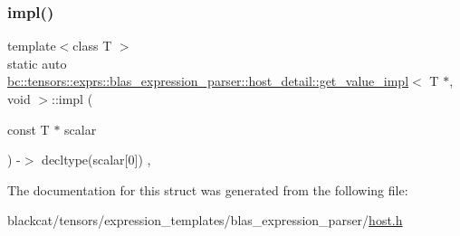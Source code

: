 \subsubsection{\texorpdfstring{impl()}{impl()}}
{\footnotesize\ttfamily template$<$class T $>$ \\
static auto \hyperlink{structbc_1_1tensors_1_1exprs_1_1blas__expression__parser_1_1host__detail_1_1get__value__impl}{bc\+::tensors\+::exprs\+::blas\+\_\+expression\+\_\+parser\+::host\+\_\+detail\+::get\+\_\+value\+\_\+impl}$<$ T $\ast$, void $>$\+::impl (\begin{DoxyParamCaption}\item[{const T $\ast$}]{scalar }\end{DoxyParamCaption}) -\/$>$ decltype(scalar\mbox{[}0\mbox{]})  \hspace{0.3cm}{\ttfamily [inline]}, {\ttfamily [static]}}



The documentation for this struct was generated from the following file\+:\begin{DoxyCompactItemize}
\item 
blackcat/tensors/expression\+\_\+templates/blas\+\_\+expression\+\_\+parser/\hyperlink{tensors_2expression__templates_2blas__expression__parser_2host_8h}{host.\+h}\end{DoxyCompactItemize}
